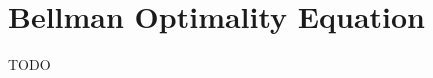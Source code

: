 \section{Bellman Optimality Equation}\label{sec:bellman-optimality-equation}
TODO
%
%
%
%
%
%
%
%
%

